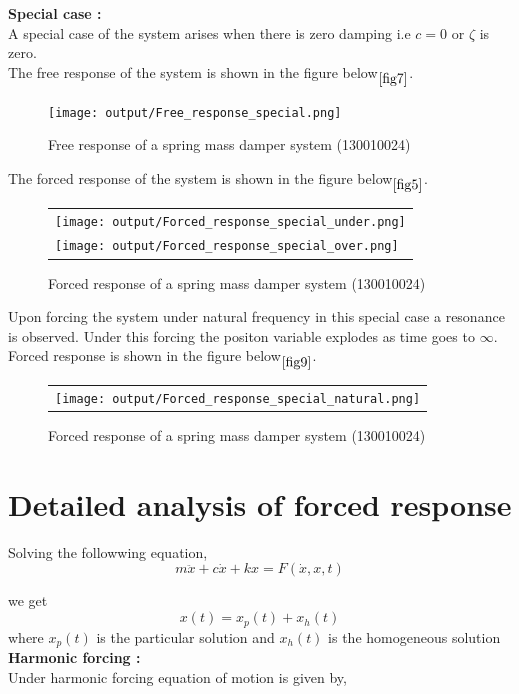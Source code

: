 \documentclass[11pt]{article}
\begin{document}
\newpage
\noindent\textbf{Special case :} \\
A special case of the system arises when there is zero damping i.e $c = 0$ or $\zeta$ is zero. \\
The free response of the system is shown in the figure below$\phantom{}_{\ref{fig7}}$.

\begin{figure}[H]
	\centering
	\centering
	\texttt{[image: output/Free\_response\_special.png]}
	\caption{Free response of a spring mass damper system (130010024)}
\end{figure}
\label{fig7}

\newpage
The forced response of the system is shown in the figure below$\phantom{}_{\ref{fig5}}$.

\begin{figure}[H]
	\centering
	\begin{tabular} {l}
	\texttt{[image: output/Forced\_response\_special\_under.png]} \\
	\texttt{[image: output/Forced\_response\_special\_over.png]} 
	\end{tabular}
	\caption{Forced response of a spring mass damper system (130010024)}
\end{figure}
\label{fig8}

\newpage
\noindent Upon forcing the system under natural frequency in this special case a resonance is observed. Under this
forcing the positon variable explodes as time goes to $\infty$.\\
Forced response is shown in the figure below$\phantom{}_{\ref{fig9}}$.


\begin{figure}[H]
	\centering
	\begin{tabular} {l}
	\texttt{[image: output/Forced\_response\_special\_natural.png]} 
	\end{tabular}
	\caption{Forced response of a spring mass damper system (130010024)}
\end{figure}
\label{fig9} 




\section{Detailed analysis of forced response\cite{norman}}

Solving the followwing equation,
$$ m\ddot{x} + c\dot{x} + kx = F(\dot{x},x,t) $$

\noindent we get 
$$ x(t) = x_p(t) + x_h(t)$$
where $x_p(t)$ is the particular solution and $x_h(t)$ is the homogeneous solution\\
\hfill \break
\noindent\textbf{Harmonic forcing :} \\
\noindent Under harmonic forcing equation of motion is given by,
\end{document}
